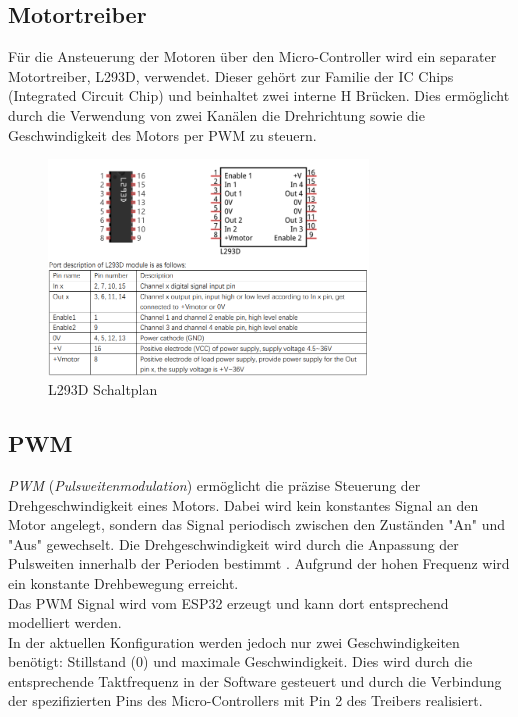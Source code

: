 \documentclass[conference,compsoc,final,a4paper]{IEEEtran}
\begin{document}
\subsection{Motortreiber}

Für die Ansteuerung der Motoren über den Micro-Controller wird ein separater Motortreiber, L293D, verwendet.
Dieser gehört zur Familie der IC Chips (Integrated Circuit Chip) und beinhaltet zwei interne H Brücken. Dies ermöglicht durch die Verwendung von zwei Kanälen die Drehrichtung 
sowie die Geschwindigkeit des Motors per PWM  zu steuern.

\begin{figure}[h]
  \centering
\includegraphics[width=8.5cm]{../images/L293D.png}
\caption{L293D Schaltplan \autocite{freenoveTutorial}}\label{Elektrik:L293D}
\end{figure}

\subsection{PWM}
\emph{PWM} (\emph{Pulsweitenmodulation}) ermöglicht die präzise Steuerung der Drehgeschwindigkeit eines Motors. Dabei wird kein konstantes Signal an den Motor angelegt,
sondern das Signal periodisch zwischen den Zuständen "An" und "Aus" gewechselt. Die Drehgeschwindigkeit wird durch die Anpassung der Pulsweiten innerhalb der Perioden 
bestimmt \autocite{611797}. Aufgrund der hohen Frequenz wird ein konstante Drehbewegung erreicht. 
\\

\noindent Das PWM Signal wird vom ESP32 erzeugt und kann dort entsprechend modelliert werden. 
\\

\noindent In der aktuellen Konfiguration werden jedoch nur zwei Geschwindigkeiten benötigt: Stillstand (0) und maximale Geschwindigkeit. 
Dies wird durch die entsprechende Taktfrequenz in der Software gesteuert und durch die Verbindung der 
spezifizierten Pins des Micro-Controllers mit Pin 2 des Treibers realisiert.
\\
\end{document}
